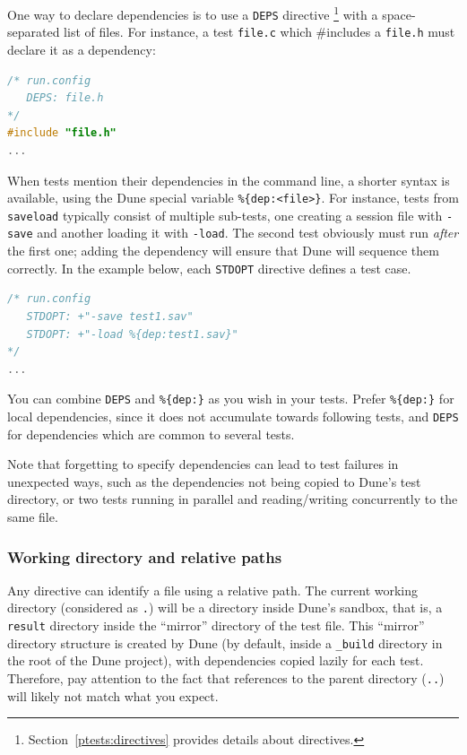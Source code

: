 One way to declare dependencies is to use a \verb|DEPS| directive%
\footnote{Section~\ref{ptests:directives} provides details about \ptests
directives.} with a space-separated list of files. For instance, a test
\verb|file.c| which \#includes a \verb|file.h| must declare it as a dependency:

\begin{lstlisting}[language=C]
/* run.config
   DEPS: file.h
*/
#include "file.h"
...
\end{lstlisting}

When tests mention their dependencies in the command line, a shorter syntax is
available, using the Dune special variable \verb|%{dep:<file>}|.
For instance, tests from \verb|saveload| typically consist of multiple
sub-tests, one creating a session file with \verb|-save| and another loading it
with \verb|-load|.
The second test obviously must run {\em after} the first one; adding the
dependency will ensure that Dune will sequence them correctly. In the example
below, each \verb|STDOPT| directive defines a test case.

\begin{lstlisting}[language=C]
/* run.config
   STDOPT: +"-save test1.sav"
   STDOPT: +"-load %{dep:test1.sav}"
*/
...
\end{lstlisting}

You can combine \verb|DEPS| and \verb|%{dep:}| as you wish in your tests.
Prefer \verb|%{dep:}| for local dependencies, since it does not accumulate
towards following tests, and \verb|DEPS| for dependencies which are common to
several tests.

Note that forgetting to specify dependencies can lead to test failures in
unexpected ways, such as the dependencies not being copied to Dune's test
directory, or two tests running in parallel and reading/writing concurrently
to the same file.

\subsubsection{Working directory and relative paths}

Any directive can identify a file using a relative path.
The current working directory (considered as \texttt{.}) will be a directory
inside Dune's sandbox, that is, a \verb|result| directory inside the ``mirror''
directory of the test file. This ``mirror'' directory structure is created
by Dune (by default, inside a \verb|_build| directory in the root of the Dune
project), with dependencies copied lazily for each test. Therefore, pay
attention to the fact that references to the parent directory
(\verb|..|) will likely not match what you expect.

